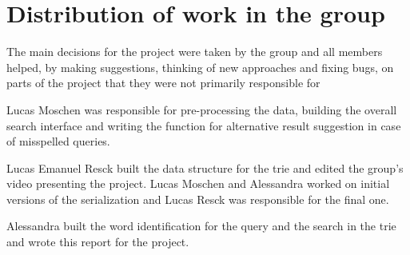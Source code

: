 \documentclass{article}
\begin{document}
\section*{Distribution of work in the group}
The main decisions for the project were taken by the group and all members helped, by making suggestions, thinking of new approaches and fixing bugs, on parts of the project that they were not primarily responsible for

Lucas Moschen was responsible for pre-processing the data, building the overall search interface and writing the function for alternative result suggestion in case of misspelled queries. 

Lucas Emanuel Resck built the data structure for the trie and edited the group's video presenting the project. Lucas Moschen and Alessandra worked on initial versions of the serialization and Lucas Resck was responsible for the final one. 

Alessandra built the word identification for the query and the search in the trie and wrote this report for the project. 

\end{document}
